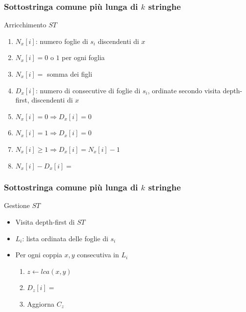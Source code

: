 \begin{frame}[fragile]
\frametitle{Sottostringa comune più lunga di $k$ stringhe}
\begin{block}{Arricchimento $ST$}
\begin{enumerate}[<+->]
\item
$N_{x}[i]$: numero foglie di $s_{i}$ discendenti di $x$
\item
$N_{x}[i]=0$ o $1$ per ogni foglia
\item
$N_{x}[i]=$ somma dei figli
\item
$D_{x}[i]$: numero di consecutive di foglie di $s_{i}$, ordinate secondo visita depth-first, discendenti di $x$
\item
$N_{x}[i]=0 \Rightarrow D_{x}[i]=0$
\item
$N_{x}[i]=1 \Rightarrow D_{x}[i]=0$
\item
$N_{x}[i]\ge 1 \Rightarrow D_{x}[i]=N_{x}[i]-1$
\item
$N_{x}[i] - D_{x}[i] =$ 
\end{enumerate}
\end{block}
\end{frame}

\begin{frame}[fragile]
\frametitle{Sottostringa comune più lunga di $k$ stringhe}
\begin{block}{Gestione $ST$}
\begin{itemize}
\item
Visita depth-first di $ST$
\item
$L_{i}$: lista ordinata delle foglie di $s_{i}$
\item
Per ogni coppia $x,y$ consecutiva in $L_{i}$
\begin{enumerate}
\item
$z\gets lca(x,y)$
\item
$D_{z}[i]=$
\item
Aggiorna $C_{z}$
\end{enumerate}
\end{itemize}
\end{block}
\end{frame}



